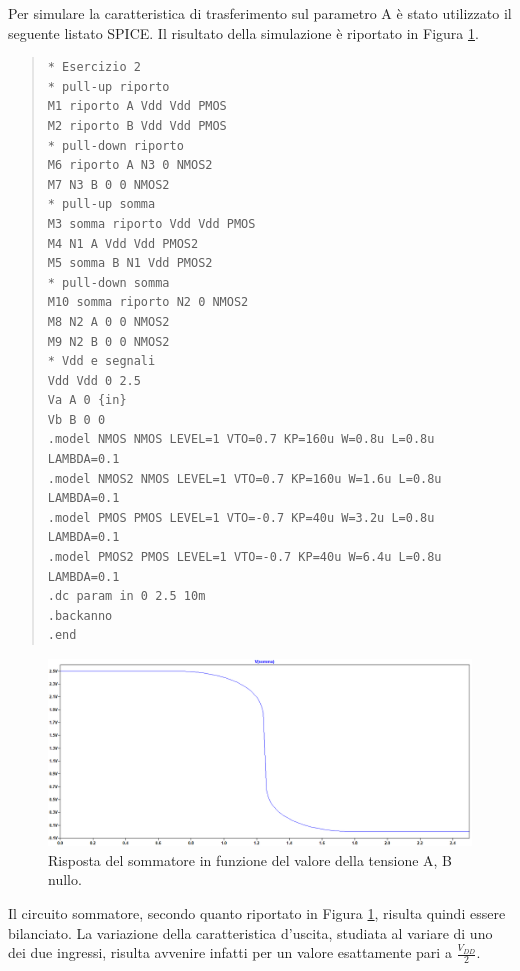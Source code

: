 \documentclass[a4paper,10pt]{article}
\begin{document}
\newpage
\noindent Per simulare la caratteristica di trasferimento sul parametro A è stato utilizzato il seguente listato SPICE. Il risultato della simulazione è riportato in Figura \ref{fig:somm1}. 
\small
\begin{quote}
\begin{verbatim}
* Esercizio 2
* pull-up riporto
M1 riporto A Vdd Vdd PMOS
M2 riporto B Vdd Vdd PMOS
* pull-down riporto
M6 riporto A N3 0 NMOS2
M7 N3 B 0 0 NMOS2
* pull-up somma
M3 somma riporto Vdd Vdd PMOS
M4 N1 A Vdd Vdd PMOS2
M5 somma B N1 Vdd PMOS2
* pull-down somma
M10 somma riporto N2 0 NMOS2
M8 N2 A 0 0 NMOS2
M9 N2 B 0 0 NMOS2
* Vdd e segnali
Vdd Vdd 0 2.5
Va A 0 {in}
Vb B 0 0
.model NMOS NMOS LEVEL=1 VTO=0.7 KP=160u W=0.8u L=0.8u LAMBDA=0.1
.model NMOS2 NMOS LEVEL=1 VTO=0.7 KP=160u W=1.6u L=0.8u LAMBDA=0.1
.model PMOS PMOS LEVEL=1 VTO=-0.7 KP=40u W=3.2u L=0.8u LAMBDA=0.1
.model PMOS2 PMOS LEVEL=1 VTO=-0.7 KP=40u W=6.4u L=0.8u LAMBDA=0.1
.dc param in 0 2.5 10m
.backanno
.end
\end{verbatim}
\end{quote}
\normalsize
\begin{figure}[h!]
  	\centering
 	\includegraphics[width=1\linewidth]{es2-1-somma.png}
  	\caption{Risposta del sommatore in funzione del valore della tensione A, B nullo.}
  	\label{fig:somm1}
\end{figure}
Il circuito sommatore, secondo quanto riportato in Figura \ref{fig:somm1}, risulta quindi essere bilanciato. La variazione della caratteristica d'uscita, studiata al variare di uno dei due ingressi, risulta avvenire infatti per un valore esattamente pari a $\frac{V_{DD}}{2}$.
\newpage
\end{document}
